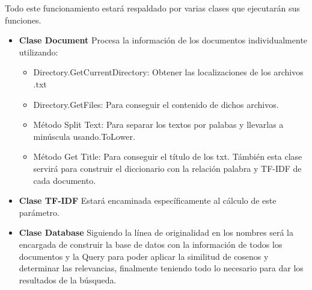 \documentclass[12pt, Letterpaper]{article}
\begin{document}
    Todo este funcionamiento estará respaldado por varias clases que ejecutarán sus funciones.\\
    \begin{itemize}
        \item \textbf{Clase Document} Procesa la información de los documentos individualmente utilizando:
        \begin{itemize}
            \item Directory.GetCurrentDirectory: Obtener las localizaciones de los archivos .txt
            \item Directory.GetFiles: Para conseguir el contenido de dichos archivos.
            \item Método Split Text: Para separar los textos por palabas y llevarlas a minúscula usando.ToLower.
            \item Método Get Title: Para conseguir el título de los txt.
            Támbién esta clase servirá para construir el diccionario con la relación palabra y TF-IDF de cada documento.
        \end{itemize}
        \item \textbf{Clase TF-IDF} Estará encaminada específicamente al cálculo de este parámetro. 
        \item \textbf{Clase Database} Siguiendo la línea de originalidad en los nombres será la encargada de 
        construir la base de datos con la información de todos los documentos y la Query para poder aplicar la 
        similitud de cosenos y determinar las relevancias, finalmente teniendo todo lo necesario para dar los 
        resultados de la búsqueda.
    \end{itemize} 
\end{document}
